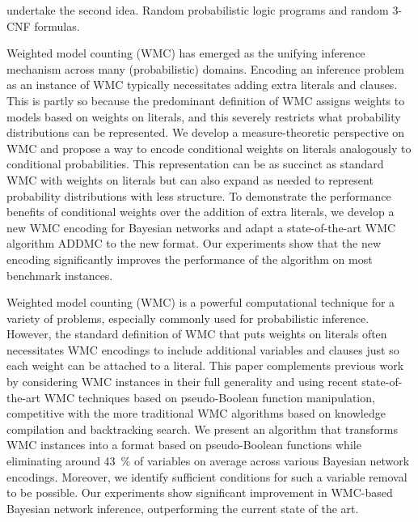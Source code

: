  undertake the second idea. Random probabilistic logic programs and random 3-CNF formulas.

\begin{displayquote}
\end{displayquote}



Weighted model counting (WMC) has emerged as the unifying inference mechanism across many (probabilistic) domains. Encoding an inference problem as an instance of WMC typically necessitates adding extra literals and clauses. This is partly so because the predominant definition of WMC assigns weights to models based on weights on literals, and this severely restricts what probability distributions can be represented. We develop a measure-theoretic perspective on WMC and propose a way to encode conditional weights on literals analogously to conditional probabilities. This representation can be as succinct as standard WMC with weights on literals but can also expand as needed to represent probability distributions with less structure. To demonstrate the performance benefits of conditional weights over the addition of extra literals, we develop a new WMC encoding for Bayesian networks and adapt a state-of-the-art WMC algorithm \textsf{ADDMC} to the new format. Our experiments show that the new encoding significantly improves the performance of the algorithm on most benchmark instances.

\begin{displayquote}
\end{displayquote}

Weighted model counting (WMC) is a powerful computational technique for a variety of problems, especially commonly used for probabilistic inference. However, the standard definition of WMC that puts weights on literals often necessitates WMC encodings to include additional variables and clauses just so each weight can be attached to a literal. This paper complements previous work by considering WMC instances in their full generality and using recent state-of-the-art WMC techniques based on pseudo-Boolean function manipulation, competitive with the more traditional WMC algorithms based on knowledge compilation and backtracking search. We present an algorithm that transforms WMC instances into a format based on pseudo-Boolean functions while eliminating around \SI{43}{\percent} of variables on average across various Bayesian network encodings. Moreover, we identify sufficient conditions for such a variable removal to be possible. Our experiments show significant improvement in WMC-based Bayesian network inference, outperforming the current state of the art.

